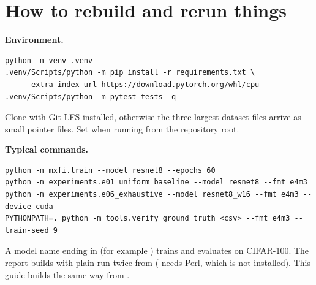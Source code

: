 \section{How to rebuild and rerun things}
\textbf{Environment.}
\begin{verbatim}
python -m venv .venv
.venv/Scripts/python -m pip install -r requirements.txt \
    --extra-index-url https://download.pytorch.org/whl/cpu
.venv/Scripts/python -m pytest tests -q
\end{verbatim}
Clone with Git LFS installed, otherwise the three largest dataset files arrive as small pointer files. Set  when running from the repository root.

\textbf{Typical commands.}
\begin{verbatim}
python -m mxfi.train --model resnet8 --epochs 60
python -m experiments.e01_uniform_baseline --model resnet8 --fmt e4m3
python -m experiments.e06_exhaustive --model resnet8_w16 --fmt e4m3 --device cuda
PYTHONPATH=. python -m tools.verify_ground_truth <csv> --fmt e4m3 --train-seed 9
\end{verbatim}
A model name ending in  (for example ) trains and evaluates on CIFAR-100. The report builds with plain  run twice from  ( needs Perl, which is not installed). This guide builds the same way from .


